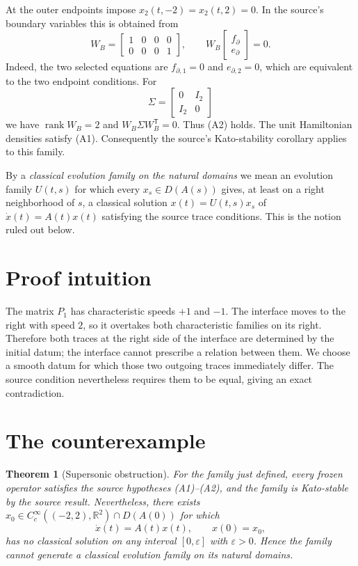 \documentclass[11pt]{article}
\newtheorem{theorem}{Theorem}
\newcommand{\R}{\mathbb{R}}
\begin{document}
At the outer endpoints impose $x_2(t,-2)=x_2(t,2)=0$.  In the source's
boundary variables this is obtained from
\[
 W_B=\begin{bmatrix}1&0&0&0\\0&0&0&1\end{bmatrix},
 \qquad
 W_B\begin{bmatrix}f_\partial\\e_\partial\end{bmatrix}=0.
\]
Indeed, the two selected equations are $f_{\partial,1}=0$ and
$e_{\partial,2}=0$, which are equivalent to the two endpoint conditions.
For
\[
 \Sigma=\begin{bmatrix}0&I_2\\I_2&0\end{bmatrix}
\]
we have $\operatorname{rank}W_B=2$ and
$W_B\Sigma W_B^{\mathsf T}=0$.  Thus (A2) holds.  The unit Hamiltonian
densities satisfy (A1).  Consequently the source's Kato-stability corollary
applies to this family.

By a \emph{classical evolution family on the natural domains} we mean an
evolution family $U(t,s)$ for which every $x_s\in D(A(s))$ gives, at least on
a right neighborhood of $s$, a classical solution
$x(t)=U(t,s)x_s$ of $\dot x(t)=A(t)x(t)$ satisfying the source trace
conditions.  This is the notion ruled out below.

\section{Proof intuition}

The matrix $P_1$ has characteristic speeds $+1$ and $-1$.  The interface
moves to the right with speed $2$, so it overtakes both characteristic
families on its right.  Therefore both traces at the right side of the
interface are determined by the initial datum; the interface cannot prescribe
a relation between them.  We choose a smooth datum for which those two
outgoing traces immediately differ.  The source condition nevertheless
requires them to be equal, giving an exact contradiction.

\section{The counterexample}

\begin{theorem}[Supersonic obstruction]
For the family just defined, every frozen operator satisfies the source
hypotheses (A1)--(A2), and the family is Kato-stable by the source result.
Nevertheless, there exists $x_0\in C_c^\infty((-2,2),\R^2)\cap D(A(0))$
for which
\[
 \dot x(t)=A(t)x(t),\qquad x(0)=x_0,
\]
has no classical solution on any interval $[0,\varepsilon]$ with
$\varepsilon>0$.  Hence the family cannot generate a classical evolution
family on its natural domains.
\end{theorem}
\end{document}
